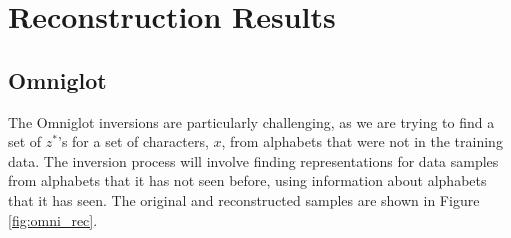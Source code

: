 \documentclass[journal]{IEEEtran}
\begin{document}






\section{Reconstruction Results}
\label{sec:results}

\subsection{Omniglot}
The Omniglot inversions are particularly challenging, as we are trying to find a set of $z^*$'s for a set of characters, $x$, from alphabets that were not in the training data. The inversion process will involve finding representations for data samples from alphabets that it has not seen before, using information about alphabets that it has seen. The original and reconstructed samples are shown in Figure \ref{fig:omni_rec}.

\end{document}
